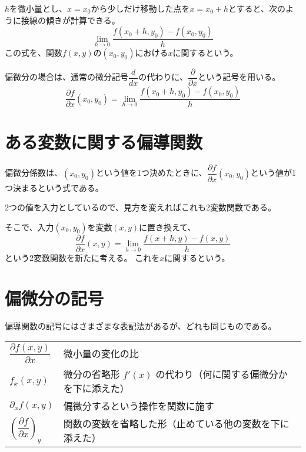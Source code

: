 \documentclass[../../../topic_calculus]{subfiles}
\begin{document}
\br

$h$を微小量とし、$x = x_0$から少しだけ移動した点を$x = x_0 + h$とすると、次のように接線の傾きが計算できる。
\begin{equation*}
  \lim_{h \to 0} \frac{f(x_0 + h, y_0) - f(x_0, y_0)}{h}
\end{equation*}
この式を、関数$f(x,y)$の$(x_0,y_0)$における$x$に関するという。

\br

偏微分の場合は、通常の微分記号$\dfrac{d}{dx}$の代わりに、$\dfrac{\partial}{\partial x}$という記号を用いる。
\begin{equation*}
  \dfrac{\partial f}{\partial x}(x_0,y_0) = \lim_{h \to 0} \frac{f(x_0 + h, y_0) - f(x_0, y_0)}{h}
\end{equation*}

\sectionline
\section{ある変数に関する偏導関数}

偏微分係数は、$(x_0,y_0)$という値を1つ決めたときに、$\dfrac{\partial f}{\partial x}(x_0,y_0)$という値が1つ決まるという式である。

2つの値を入力としているので、見方を変えればこれも2変数関数である。

\br

そこで、入力$(x_0,y_0)$を変数$(x,y)$に置き換えて、
\begin{equation*}
  \dfrac{\partial f}{\partial x}(x,y) = \lim_{h \to 0} \frac{f(x + h, y) - f(x, y)}{h}
\end{equation*}
という2変数関数を新たに考える。
これを$x$に関するという。

\sectionline
\section{偏微分の記号}

偏導関数の記号にはさまざまな表記法があるが、どれも同じものである。

\br

\begin{table}[h]
\renewcommand{\arraystretch}{1.5} %
\centering
\begin{tabular}{ll}
$\dfrac{\partial f(x,y)}{\partial x}$ & 微小量の変化の比 \\ 
$f_x(x,y)$ & 微分の省略形 $f'(x)$ の代わり（何に関する偏微分かを下に添えた） \\
$\partial_x f(x,y)$ & 偏微分するという操作を関数に施す \\
$\left(\dfrac{\partial f }{\partial x}\right)_y$ & 関数の変数を省略した形（止めている他の変数を下に添えた） \\
\end{tabular}
\end{table}
\end{document}
